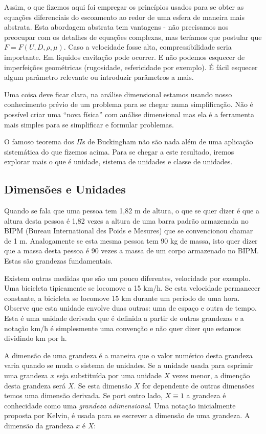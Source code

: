 Assim, o que fizemos aqui foi empregar os princípios usados para se obter as equações diferenciais do escoamento ao redor de uma esfera de maneira mais abstrata. Esta abordagem abstrata tem vantagens - não precisamos nos preocupar com os detalhes de equações complexas,  mas teríamos que postular que $F = F(U, D, \rho, \mu)$. Caso a velocidade fosse alta, compressibilidade seria importante. Em líquidos cavitação pode ocorrer. E não podemos esquecer de imperfeições geométricas (rugosidade, esfericidade por exemplo). É fácil esquecer algum parâmetro relevante ou introduzir parâmetros a mais. 

Uma coisa deve ficar clara, na análise dimensional estamos usando nosso conhecimento prévio de um problema para se chegar numa simplificação. Não é possível criar uma ``nova física'' com análise dimensional mas ela é a ferramenta mais simples para se simplificar e formular problemas.

O famoso teorema dos $\Pi$s de Buckingham não são nada além de uma aplicação sistemática do que fizemos acima. Para se chegar a este resultado, iremos explorar mais o que é unidade, sistema de unidades e classe de unidades.



\subsection{Dimensões e Unidades}

Quando se fala que uma pessoa tem 1,82 m de altura, o que se quer dizer é que a altura desta pessoa é 1,82 vezes a altura de uma barra padrão armazenada no BIPM (Bureau International des Poids e Mesures) que se convencionou chamar de 1 m. Analogamente se esta mesma pessoa tem 90 kg de massa, isto quer dizer que a massa desta pessoa é 90 vezes a massa de um corpo armazenado no BIPM. Estas são grandezas fundamentais. 

Existem outras medidas que são um pouco diferentes, velocidade por exemplo. Uma bicicleta tipicamente se locomove a 15 km/h. Se esta velocidade permanecer constante, a bicicleta se locomove 15 km durante um período de uma hora. Observe que esta unidade envolve duas outras: uma de espaço e outra de tempo. Esta é uma unidade derivada que é definida a partir de outras grandezas e a notação km/h é simplesmente uma convenção e não quer dizer que estamos dividindo km por h.

A dimensão de uma grandeza é a maneira que o valor numérico desta grandeza varia quando se muda o sistema de unidades. Se a unidade usada para esprimir uma grandeza $x$ seja substituída por uma unidade $X$ vezes menor, a dimenção desta grandeza será $X$. Se esta dimensão $X$ for dependente de outras dimensões temos uma dimensão derivada. Se port outro lado, $X\equiv 1$ a grandeza é conhecidade como uma \emph{grandeza adimensional}. Uma notação inicialmente proposta por Kelvin, é usada para se escrever a dimensão de uma grandeza. A dimensão da grandeza $x$ é $X$:


